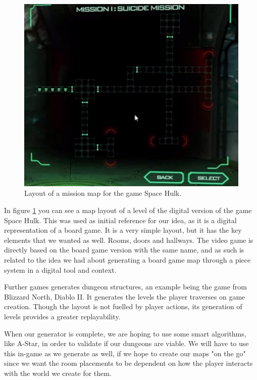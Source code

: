 \documentclass[conference,compsoc]{IEEEtran}
\begin{document}
\begin{figure}[h]
	\graphicspath{{figures/}}
	\includegraphics[width = \columnwidth ]{SpacehulkMap.png}
	\caption{Layout of a mission map for the game Space Hulk.}
	\label{fig:spacehulk}
\end{figure}

In figure \ref{fig:spacehulk} you can see a map layout of a level of the digital version of the game Space Hulk\cite{SpaceHulkvid}. This was used as initial reference for our idea, as it is a digital representation of a board game. It is a very simple layout, but it has the key elements that we wanted as well. Rooms, doors and hallways.
The video game is directly based on the board game version with the same name\cite{SpaceHulkBoard}, and as such is related to the idea we had about generating a board game map through a piece system in a digital tool and context. 

Further games generates dungeon structures, an example being the game from Blizzard North, Diablo II\cite{Diablo2}. It generates the levels the player traverses on game creation. Though the layout is not fuelled by player actions, its generation of levels provides a greater replayability. 

When our generator is complete, we are hoping to use some smart algorithms, like A-Star, in order to validate if our dungeons are viable. We will have to use this in-game as we generate as well, if we hope to create our maps "on the go" since we want the room placements to be dependent on how the player interacts with the world we create for them.
\end{document}
